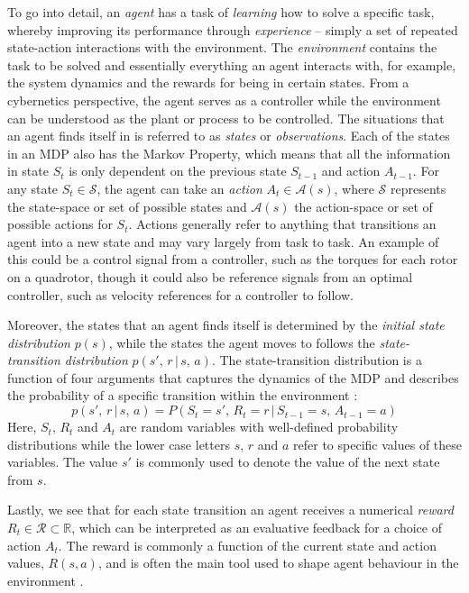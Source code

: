 To go into detail, an \textit{agent} has a task of \textit{learning} how to solve a specific task, whereby improving its performance through \textit{experience} -- simply a set of repeated state-action interactions with the environment. 
The \textit{environment} contains the task to be solved and essentially everything an agent interacts with, for example, the system dynamics and the rewards for being in certain states. From a cybernetics perspective, the agent serves as a controller while the environment can be understood as the plant or process to be controlled.
The situations that an agent finds itself in is referred to as \textit{states} or \textit{observations}. Each of the states in an MDP also has the Markov Property, which means that all the information in state $S_t$ is only dependent on the previous state $S_{t-1}$ and action $A_{t-1}$. 
For any state $S_t \in \mathcal{S}$, the agent can take an \textit{action} $A_t \in \mathcal{A}(s)$, where $\mathcal{S}$ represents the state-space or set of possible states and $\mathcal{A}(s)$ the action-space or set of possible actions for $S_t$. Actions generally refer to anything that transitions an agent into a new state and may vary largely from task to task. An example of this could be a control signal from a controller, such as the torques for each rotor on a quadrotor, though it could also be reference signals from an optimal controller, such as velocity references for a controller to follow.

Moreover, the states that an agent finds itself is determined by the \textit{initial state distribution} $p(s)$, while the states the agent moves to follows the \textit{state-transition distribution} $p(s',\, r\, |\, s,\, a)$. The state-transition distribution is a function of four arguments that captures the dynamics of the MDP and describes the probability of a specific transition within the environment \cite{suttonAndBartoBook}:
\begin{equation}
    p(s',\, r\, |\, s,\, a) = P(S_t = s',\, R_t = r\, |\, S_{t-1} = s,\, A_{t-1} = a)
\end{equation}
Here, $S_t$, $R_t$ and $A_t$ are random variables with well-defined probability distributions while the lower case letters $s$, $r$ and $a$ refer to specific values of these variables. The value $s'$ is commonly used to denote the value of the next state from $s$.

Lastly, we see that for each state transition an agent receives a numerical \textit{reward} $R_t \in \mathcal{R} \subset \mathbb{R}$, which can be interpreted as an evaluative feedback for a choice of action $A_t$. The reward is commonly a function of the current state and action values, $R(s, a)$, and is often the main tool used to shape agent behaviour in the environment \cite{RLinRoboticsSurvey}. 

